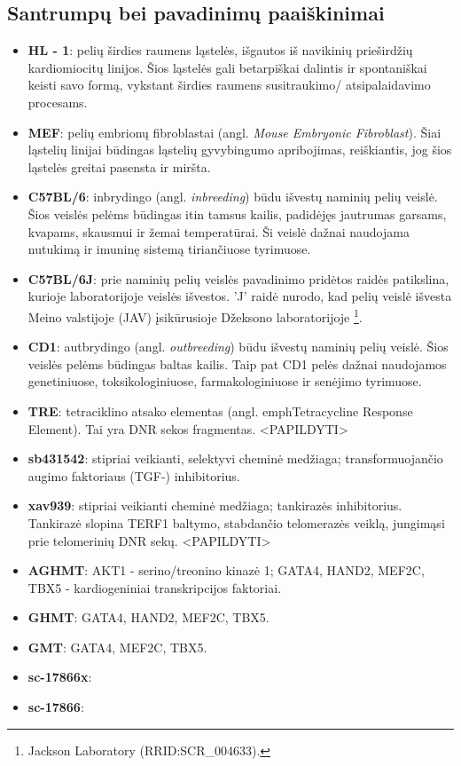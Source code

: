 \documentclass[12pt]{article}
\begin{document}
\subsection{Santrumpų bei pavadinimų paaiškinimai}
\begin{itemize}
    \item \textbf{HL - 1}: pelių širdies raumens ląstelės, išgautos
          iš navikinių prieširdžių kardiomiocitų linijos. Šios ląstelės
          gali betarpiškai dalintis ir spontaniškai keisti
          savo formą, vykstant širdies raumens susitraukimo/
          atsipalaidavimo procesams.
    \item \textbf{MEF}: pelių embrionų fibroblastai (angl.
          \emph{Mouse Embryonic Fibroblast}). Šiai ląstelių
          linijai būdingas ląstelių gyvybingumo apribojimas,
          reiškiantis, jog šios ląstelės greitai pasensta ir miršta.
    \item \textbf{C57BL/6}: inbrydingo (angl. \emph{inbreeding}) būdu
          išvestų naminių pelių veislė. Šios veislės pelėms
          būdingas itin tamsus kailis, padidėjęs jautrumas garsams,
          kvapams, skausmui ir žemai temperatūrai. Ši veislė
          dažnai naudojama nutukimą ir imuninę sistemą tiriančiuose
          tyrimuose.
    \item \textbf{C57BL/6J}: prie naminių pelių veislės pavadinimo
          pridėtos raidės patikslina, kurioje laboratorijoje veislės
          išvestos. 'J' raidė nurodo, kad pelių veislė išvesta Meino
          valstijoje (JAV) įsikūrusioje Džeksono laboratorijoje
          \footnote{Jackson Laboratory (RRID:SCR\_004633).}.
    \item \textbf{CD1}: autbrydingo (angl. \emph{outbreeding}) būdu
          išvestų naminių pelių veislė. Šios veislės pelėms
          būdingas baltas kailis. Taip pat CD1 pelės dažnai naudojamos
          genetiniuose, toksikologiniuose, farmakologiniuose ir
          senėjimo tyrimuose.
    \item \textbf{TRE}: tetraciklino atsako elementas (angl. 
          emph{Tetracycline Response Element}). Tai yra DNR sekos
          fragmentas. <PAPILDYTI>
    \item \textbf{sb431542}: stipriai veikianti, selektyvi cheminė
          medžiaga; transformuojančio augimo faktoriaus {\textbeta}
          (TGF-{\textbeta}) inhibitorius.
    \item \textbf{xav939}: stipriai veikianti cheminė medžiaga;
          tankirazės inhibitorius. Tankirazė slopina TERF1 baltymo,
          stabdančio telomerazės veiklą, jungimąsi prie telomerinių
          DNR sekų. <PAPILDYTI>
    \item \textbf{AGHMT}: AKT1 - serino/treonino kinazė 1; GATA4,
          HAND2, MEF2C, TBX5 - kardiogeniniai transkripcijos faktoriai.
    \item \textbf{GHMT}: GATA4, HAND2, MEF2C, TBX5.
    \item \textbf{GMT}: GATA4, MEF2C, TBX5.
    \item \textbf{sc-17866x}:
    \item \textbf{sc-17866}:
\end{itemize}
\end{document}
